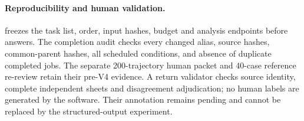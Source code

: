 \paragraph{Reproducibility and human validation.}
 freezes the task list, order, input hashes, budget and analysis endpoints before answers. The completion audit checks every changed alias, source hashes, common-parent hashes, all scheduled conditions, and absence of duplicate completed jobs. The separate 200-trajectory human packet and 40-case reference re-review retain their pre-V4 evidence. A return validator checks source identity, complete independent sheets and disagreement adjudication; no human labels are generated by the software. Their annotation remains pending and cannot be replaced by the structured-output experiment.
